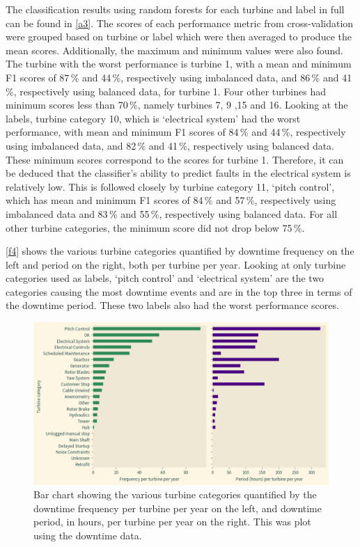The classification results using random forests for each turbine and label in full can be found in \autoref{a3}. The scores of each performance metric from cross-validation were grouped based on turbine or label which were then averaged to produce the mean scores. Additionally, the maximum and minimum values were also found. The turbine with the worst performance is turbine 1, with a mean and minimum F1 scores of 87\,\% and 44\,\%, respectively using imbalanced data, and 86\,\% and 41\,\%, respectively using balanced data, for turbine 1. Four other turbines had minimum scores less than 70\,\%, namely turbines 7, 9 ,15 and 16. Looking at the labels, turbine category 10, which is `electrical system' had the worst performance, with mean and minimum F1 scores of 84\,\% and 44\,\%, respectively using imbalanced data, and 82\,\% and 41\,\%, respectively using balanced data. These minimum scores correspond to the scores for turbine 1. Therefore, it can be deduced that the classifier's ability to predict faults in the electrical system is relatively low. This is followed closely by turbine category 11, `pitch control', which has mean and minimum F1 scores of 84\,\% and 57\,\%, respectively using imbalanced data and 83\,\% and 55\,\%, respectively using balanced data. For all other turbine categories, the minimum score did not drop below 75\,\%.

\autoref{f4} shows the various turbine categories quantified by downtime frequency on the left and period on the right, both per turbine per year. Looking at only turbine categories used as labels, `pitch control' and `electrical system' are the two categories causing the most downtime events and are in the top three in terms of the downtime period. These two labels also had the worst performance scores.

\begin{figure}
  \centering
  \includegraphics[width=\textwidth]{../images/f4}
  \caption{\label{f4}Bar chart showing the various turbine categories quantified by the downtime frequency per turbine per year on the left, and downtime period, in hours, per turbine per year on the right. This was plot using the downtime data.}
\end{figure}

